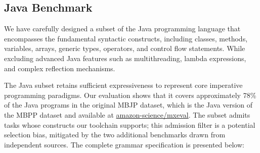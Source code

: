 \documentclass[manuscript,screen]{acmart}
\begin{document}
\subsection{Java Benchmark}
We have carefully designed a subset of the Java programming language that encompasses the fundamental syntactic constructs, including classes, methods, variables, arrays, generic types, operators, and control flow statements. While excluding advanced Java features such as multithreading, lambda expressions, and complex reflection mechanisms.

The Java subset retains sufficient expressiveness to represent core imperative programming paradigms. Our evaluation shows that it covers approximately 78\% of the Java programs in the original MBJP dataset, which is the Java version of  {\color{revblue}the } MBPP dataset and available at \href{https://github.com/amazon-science/mxeval}{amazon-science/mxeval}.
The  {\color{revblue}subset admits tasks whose constructs our toolchain supports; this admission filter is a potential selection bias, mitigated by the two additional benchmarks drawn from independent sources.
The } complete grammar specification is presented below:
\end{document}
